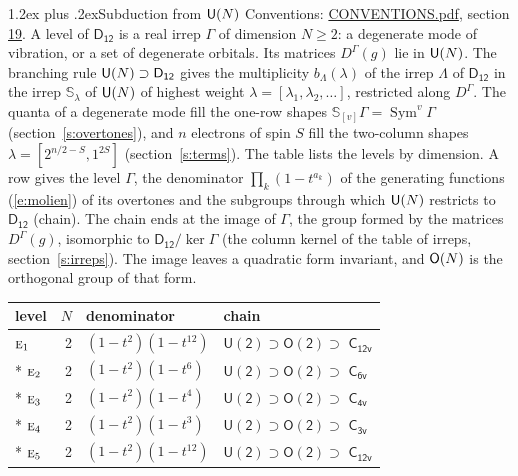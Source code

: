 \documentclass[10pt,a4paper]{article}
\makeatletter
\renewcommand\section{\@startsection{section}{1}{\z@}{-3ex plus -1ex minus -.2ex}%
  {1.2ex plus .2ex}{\normalfont\large\sffamily\bfseries\color{parttitle}}}
\numberwithin{equation}{section}
\newcommand{\grp}[1]{\mathsf{#1}}
\newcommand{\irr}[1]{\text{\normalfont\scshape #1}}
\newcommand{\repD}[1]{D^{#1}}
\newcommand{\schur}[1]{\mathbb{S}_{#1}}
\newcommand{\shape}[1]{[#1]}
\makeatother
\begin{document}
\section{Subduction from \texorpdfstring{$\grp{U(\mathnormal{N})}$}{U(N)}}\label{s:unitary}
Conventions: \href{../../CONVENTIONS.pdf}{CONVENTIONS.pdf}, section \href{../../CONVENTIONS.pdf\#conv.19}{19}.
\leavevmode\label{n:local.level.dimension}A level of $\grp{D_{12}}$ is a real irrep $\Gamma$ of dimension $N \ge 2$: a degenerate mode of vibration, or a set of degenerate orbitals. \label{n:group.unitary}Its matrices $\repD{\Gamma}(g)$ lie in $\grp{U(\mathnormal{N})}$. \label{n:irrep.schur}\label{n:shape.partition}\label{n:local.partition}\label{n:function.multiplicity.unitary}The branching rule $\grp{U(\mathnormal{N})} \supset \grp{D_{12}}$ gives the multiplicity $b_\Lambda(\lambda)$ of the irrep $\Lambda$ of $\grp{D_{12}}$ in the irrep $\schur{\lambda}$ of $\grp{U(\mathnormal{N})}$ of highest weight $\lambda = \shape{\lambda_1, \lambda_2, \dots}$, restricted along $\repD{\Gamma}$. \label{n:local.partition.power}\label{n:local.electrons}\label{n:local.spin}The quanta of a degenerate mode fill the one-row shapes $\schur{\shape{v}}\Gamma = \operatorname{Sym}^{v}\Gamma$ (section~\ref{s:overtones}), and $n$ electrons of spin $S$ fill the two-column shapes $\lambda = \shape{2^{n/2-S}, 1^{2S}}$ (section~\ref{s:terms}).
The table lists the levels by dimension. \label{n:head.level}\label{n:head.denominator}\label{n:index.overtone.denominator}\label{n:head.chain}A row gives the level $\Gamma$, the denominator $\prod_k (1 - t^{a_k})$ of the generating functions (\ref{e:molien}) of its overtones and the subgroups through which $\grp{U(\mathnormal{N})}$ restricts to $\grp{D_{12}}$ (chain). The chain ends at the image of $\Gamma$, the group formed by the matrices $\repD{\Gamma}(g)$, isomorphic to $\grp{D_{12}}/\ker\Gamma$ (the column kernel of the table of irreps, section~\ref{s:irreps}). The image leaves a quadratic form invariant, and $\grp{O(\mathnormal{N})}$ is the orthogonal group of that form.
{\small\begin{longtable}{@{}lrll@{}}\toprule
level & $N$ & denominator & chain\\\midrule\endhead
\bottomrule\endfoot\endlastfoot
$\irr{e}_{1}$ & 2 & $(1-t^{2})(1-t^{12})$ & $\grp{U(2)} \supset \grp{O(2)} \supset$ \href{C12v.pdf}{$\grp{C_{12v}}$}\\*
$\irr{e}_{2}$ & 2 & $(1-t^{2})(1-t^{6})$ & $\grp{U(2)} \supset \grp{O(2)} \supset$ \href{C6v.pdf}{$\grp{C_{6v}}$}\\*
$\irr{e}_{3}$ & 2 & $(1-t^{2})(1-t^{4})$ & $\grp{U(2)} \supset \grp{O(2)} \supset$ \href{C4v.pdf}{$\grp{C_{4v}}$}\\*
$\irr{e}_{4}$ & 2 & $(1-t^{2})(1-t^{3})$ & $\grp{U(2)} \supset \grp{O(2)} \supset$ \href{C3v.pdf}{$\grp{C_{3v}}$}\\*
$\irr{e}_{5}$ & 2 & $(1-t^{2})(1-t^{12})$ & $\grp{U(2)} \supset \grp{O(2)} \supset$ \href{C12v.pdf}{$\grp{C_{12v}}$}\\
\bottomrule\end{longtable}}
\end{document}
